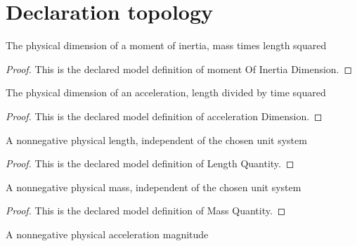 \section{Declaration topology}
\begin{definition}
  \label{def:physics:phyx-mini-0266:phyxminiproblems-problemphyxmini0266-momentofinertiadimension}
  The physical dimension of a moment of inertia, mass times length squared
\end{definition}
\begin{proof}
  This is the declared model definition of moment Of Inertia Dimension.
\end{proof}
\begin{definition}
  \label{def:physics:phyx-mini-0266:phyxminiproblems-problemphyxmini0266-accelerationdimension}
  The physical dimension of an acceleration, length divided by time squared
\end{definition}
\begin{proof}
  This is the declared model definition of acceleration Dimension.
\end{proof}
\begin{definition}
  \label{def:physics:phyx-mini-0266:phyxminiproblems-problemphyxmini0266-lengthquantity}
  A nonnegative physical length, independent of the chosen unit system
\end{definition}
\begin{proof}
  This is the declared model definition of Length Quantity.
\end{proof}
\begin{definition}
  \label{def:physics:phyx-mini-0266:phyxminiproblems-problemphyxmini0266-massquantity}
  A nonnegative physical mass, independent of the chosen unit system
\end{definition}
\begin{proof}
  This is the declared model definition of Mass Quantity.
\end{proof}
\begin{definition}
  \label{def:physics:phyx-mini-0266:phyxminiproblems-problemphyxmini0266-accelerationquantity}
  A nonnegative physical acceleration magnitude
\end{definition}
